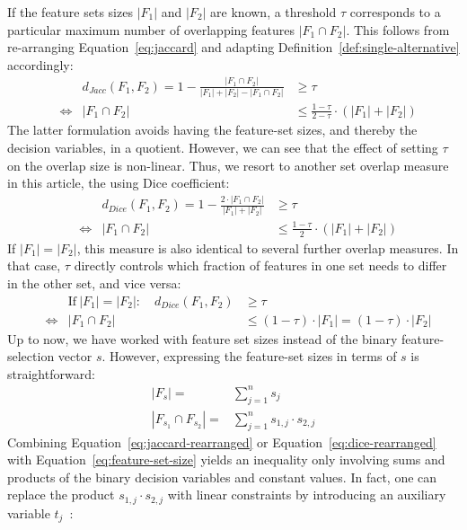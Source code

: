 \documentclass{article}
\theoremstyle{definition}
\begin{document}
If the feature sets sizes $|F_1|$ and $|F_2|$ are known, a threshold $\tau$ corresponds to a particular maximum number of overlapping features $|F_1 \cap F_2|$.
This follows from re-arranging Equation~\ref{eq:jaccard} and adapting Definition~\ref{def:single-alternative} accordingly:
%
\begin{align}
	& & d_{Jacc}(F_1,F_2) = 1 - \frac{|F_1 \cap F_2|}{|F_1| + |F_2| - |F_1 \cap F_2|} &\geq \tau \nonumber \\
	&\Leftrightarrow & |F_1 \cap F_2| &\leq \frac{1 - \tau}{2 - \tau} \cdot (|F_1| + |F_2|)
	\label{eq:jaccard-rearranged}
\end{align}
%
The latter formulation avoids having the feature-set sizes, and thereby the decision variables, in a quotient.
However, we can see that the effect of setting $\tau$ on the overlap size is non-linear.
Thus, we resort to another set overlap measure in this article, the using Dice coefficient:
%
\begin{align}
	& & d_{Dice}(F_1,F_2) = 1 - \frac{2 \cdot |F_1 \cap F_2|}{|F_1| + |F_2|} &\geq \tau \nonumber \\
	&\Leftrightarrow & |F_1 \cap F_2| &\leq \frac{1 - \tau}{2} \cdot (|F_1| + |F_2|)
	\label{eq:dice-rearranged}
\end{align}
%
If $|F_1| = |F_2|$, this measure is also identical to several further overlap measures.
In that case, $\tau$ directly controls which fraction of features in one set needs to differ in the other set, and vice versa:
%
\begin{align}
	& &\text{If}~|F_1| = |F_2|: \quad d_{Dice}(F_1,F_2) &\geq \tau \nonumber \\
	&\Leftrightarrow & |F_1 \cap F_2| &\leq (1 - \tau) \cdot |F_1| = (1 - \tau) \cdot |F_2|
\end{align}
%
Up to now, we have worked with feature set sizes instead of the binary feature-selection vector $s$.
However, expressing the feature-set sizes in terms of $s$ is straightforward:
%
\begin{align}
	|F_s| =& \sum_{j=1}^n s_j \nonumber \\
	|F_{s_1} \cap F_{s_2}| =& \sum_{j=1}^n s_{1,j} \cdot s_{2,j}
	\label{eq:feature-set-size}
\end{align}
%
Combining Equation~\ref{eq:jaccard-rearranged} or Equation~\ref{eq:dice-rearranged} with Equation~\ref{eq:feature-set-size} yields an inequality only involving sums and products of the binary decision variables and constant values.
In fact, one can replace the product $s_{1,j} \cdot s_{2,j}$ with linear constraints by introducing an auxiliary variable $t_j$~\cite{mosek2021modeling}:
\end{document}
